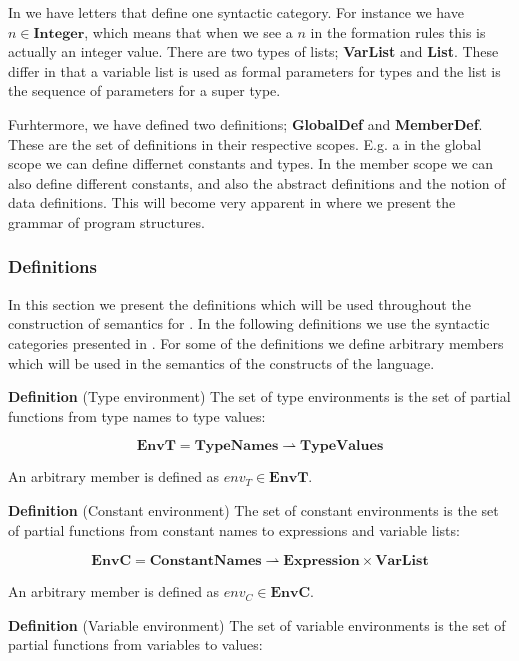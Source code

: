 In  we have letters that define one syntactic
category. For instance we have $n \in \mathbf{Integer}$, which means that when
we see a $n$ in the formation rules this is actually an integer value. There
are two types of lists; \textbf{VarList} and \textbf{List}. These differ in that
a variable list is used as formal parameters for types and the list is the
sequence of parameters for a super type. 

Furhtermore, we have defined two definitions; \textbf{GlobalDef} and
\textbf{MemberDef}. These are the set of definitions in their respective scopes.
E.g. a in the global scope we can define differnet constants and types. In the
member scope we can also define different constants, and also the abstract
definitions and the notion of data definitions. This will become very apparent
in  where we present the grammar of program structures.

\subsubsection{Definitions}
\label{sec:abstractdefinitions}

In this section we present the definitions which will be used throughout the
construction of semantics for \productname{}. In the following definitions we
use the syntactic categories presented in . For some of
the definitions we define arbitrary members which will be used in the semantics
of the constructs of the language.

\textbf{Definition} (Type environment) \hspace{0.5cm} The set of type environments is the set of
partial functions from type names to type values:

\[
  \mathbf{EnvT} = \mathbf{TypeNames} \rightharpoonup \mathbf{TypeValues}
\]

An arbitrary member is defined as $env_{T} \in \mathbf{EnvT}$.


\textbf{Definition} (Constant environment) \hspace{0.5cm} The set of constant environments is the set
of partial functions from constant names to expressions and variable lists:

\[
  \mathbf{EnvC} = \mathbf{ConstantNames} \rightharpoonup \mathbf{Expression}
  \times \mathbf{VarList}
\]

An arbitrary member is defined as $env_{C} \in \mathbf{EnvC}$.

\textbf{Definition} (Variable environment) \hspace{0.5cm} The set of variable environments is the set
of partial functions from variables to values:

